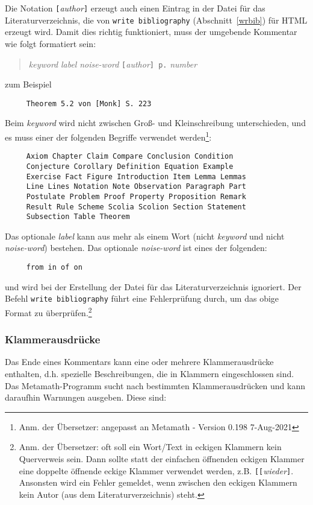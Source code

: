 Die Notation \texttt{[}{\em author}\texttt{]} erzeugt auch einen Eintrag in der Datei für das Literaturverzeichnis, die von \texttt{write bibliography} (Abschnitt~\ref{wrbib}) für {\sc HTML} erzeugt wird. Damit dies richtig funktioniert, muss der umgebende Kommentar wie folgt formatiert sein:
\begin{quote}
    {\em keyword} {\em label} {\em noise-word}
     \texttt{[}{\em author}\texttt{] p.} {\em number}
\end{quote}
zum Beispiel
\begin{verbatim}
     Theorem 5.2 von [Monk] S. 223
\end{verbatim}
Beim {\em keyword} wird nicht zwischen Groß- und Kleinschreibung unterschieden, und es muss einer der folgenden Begriffe verwendet werden\footnote{Anm. der Übersetzer: angepasst an Metamath - Version 0.198 7-Aug-2021}:
\begin{verbatim}
     Axiom Chapter Claim Compare Conclusion Condition
     Conjecture Corollary Definition Equation Example
     Exercise Fact Figure Introduction Item Lemma Lemmas
     Line Lines Notation Note Observation Paragraph Part
     Postulate Problem Proof Property Proposition Remark
     Result Rule Scheme Scolia Scolion Section Statement
     Subsection Table Theorem
\end{verbatim}
Das optionale {\em label} kann aus mehr als einem Wort (nicht {\em keyword} und nicht {\em noise-word}) bestehen. Das optionale {\em noise-word} ist eines der folgenden:
\begin{verbatim}
     from in of on
\end{verbatim}
und wird bei der Erstellung der Datei für das Literaturverzeichnis ignoriert.  Der Befehl \texttt{write biblio\-graphy} führt eine Fehlerprüfung durch, um das obige Format zu überprüfen.\footnote{Anm. der Übersetzer: oft soll ein Wort/Text in eckigen Klammern kein Querverweis sein. Dann sollte statt der einfachen öffnenden eckigen Klammer eine doppelte öffnende eckige Klammer verwendet werden, z.B. \texttt{[}\texttt{[}{\em wieder}\texttt{]}. Ansonsten wird ein Fehler gemeldet, wenn zwischen den eckigen Klammern kein Autor (aus dem Literaturverzeichnis) steht.}

\subsubsection{Klammerausdrücke}\label{parentheticals}

Das Ende eines Kommentars kann eine oder mehrere Klammerausdrücke enthalten, d.h. spezielle Beschreibungen, die in Klammern eingeschlossen sind. Das Metamath-Programm sucht nach bestimmten Klammerausdrücken und kann daraufhin Warnungen ausgeben. Diese sind:

